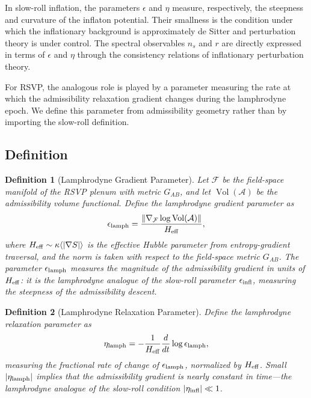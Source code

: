 \documentclass[12pt, a4paper]{article}
\newtheorem{definition}{Definition}
\newcommand{\calA}{\mathcal{A}}
\newcommand{\calF}{\mathcal{F}}
\newcommand{\etalamph}{\eta_{\rm lamph}}
\newcommand{\epslamph}{\epsilon_{\rm lamph}}
\newcommand{\Heff}{H_{\rm eff}}
\newcommand{\Vol}{\operatorname{Vol}}
\begin{document}
In slow-roll inflation, the parameters $\epsilon$ and $\eta$ measure, respectively,
the steepness and curvature of the inflaton potential. Their smallness is the
condition under which the inflationary background is approximately de Sitter and
perturbation theory is under control. The spectral observables $n_s$ and $r$ are
directly expressed in terms of $\epsilon$ and $\eta$ through the consistency
relations of inflationary perturbation theory.

For RSVP, the analogous role is played by a parameter measuring the rate at which
the admissibility relaxation gradient changes during the lamphrodyne epoch. We
define this parameter from admissibility geometry rather than by importing the
slow-roll definition.

\subsection{Definition}

\begin{definition}[Lamphrodyne Gradient Parameter]
Let $\calF$ be the field-space manifold of the RSVP plenum with metric $G_{AB}$,
and let $\Vol(\calA)$ be the admissibility volume functional. Define the
\emph{lamphrodyne gradient parameter} as
\begin{equation}
\epslamph = \frac{\left\|\nabla_{\calF}\log\Vol(\calA)\right\|}{\Heff},
\label{eq:epslamph}
\end{equation}
where $\Heff \sim \kappa\langle|\nabla S|\rangle$ is the effective Hubble parameter
from entropy-gradient traversal, and the norm is taken with respect to the
field-space metric $G_{AB}$. The parameter $\epslamph$ measures the magnitude of
the admissibility gradient in units of $\Heff$: it is the lamphrodyne analogue of
the slow-roll parameter $\epsilon_{\rm infl}$, measuring the steepness of the
admissibility descent.
\end{definition}

\begin{definition}[Lamphrodyne Relaxation Parameter]
Define the \emph{lamphrodyne relaxation parameter} as
\begin{equation}
\etalamph = -\frac{1}{\Heff}\frac{d}{dt}\log\epslamph,
\label{eq:etalamph}
\end{equation}
measuring the fractional rate of change of $\epslamph$, normalized by $\Heff$.
Small $|\etalamph|$ implies that the admissibility gradient is nearly constant in
time---the lamphrodyne analogue of the slow-roll condition $|\eta_{\rm infl}| \ll 1$.
\end{definition}
\end{document}

